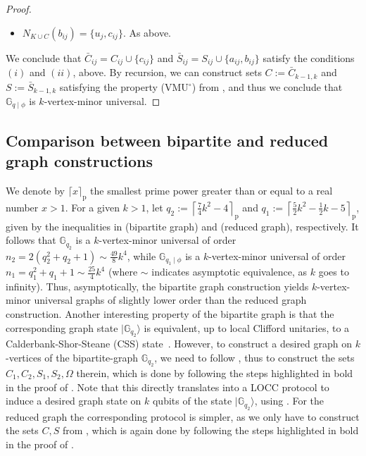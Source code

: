 \documentclass[a4paper,UKenglish,cleveref, autoref, thm-restate]{arxiv}
\newcommand{\ket}[1]{{\ensuremath{\lvert#1\rangle}}}
\newcommand{\G}[1][q]{\mathbb{G}_{#1}}
\newcommand{\Gphi}[1][q]{\mathbb{G}_{#1\mid\phi}}
\begin{document}
\begin{proof}
\begin{itemize}
        \item $N_{K \cup C}(b_{ij}) = \{u_{j}, c_{ij}\}$. As above.
    \end{itemize}
    
    We conclude that $\bar{C}_{ij} = C_{ij} \cup\{c_{ij}\}$ and $\bar{S}_{ij} = S_{ij} \cup\{a_{ij}, b_{ij}\}$ satisfy the conditions $(i)$ and $(ii)$, above. By recursion, we can construct sets $C := \bar{C}_{k-1,k}$ and $S := \bar{S}_{k-1,k}$ satisfying the property (VMU$^\circ$) from , and thus we conclude that $\Gphi$ is  $k$-vertex-minor universal.
\end{proof}

\subsection{Comparison between bipartite  and  reduced graph constructions}
\label{subsec:comparison-bipartite-reduced}

We denote by $\lceil x \rceil_\text{p}$ the smallest prime power greater than or equal to a real number $x > 1$. For a given $k > 1$, let $q_{2} := \left\lceil \frac{7}{4} k^2 - 4\right\rceil_\text{p}$ and $q_{1} := \left\lceil \frac{5}{2} k^2 - \frac{1}{2} k - 5\right\rceil_\text{p}$, given by the inequalities in  (bipartite graph) and  (reduced graph), respectively. It follows that $\G[q_2]$ is a $k$-vertex-minor universal of order $n_2 = 2(q_2^2+q_2+1) \sim \frac{49}{8}k^4$, while $\Gphi[q_1]$ is a $k$-vertex-minor universal of order $n_1 = q_1^2+q_1+1 \sim \frac{25}{4}k^4$  (where $\sim$ indicates asymptotic equivalence, as $k$ goes to infinity). Thus, asymptotically, the bipartite graph construction yields $k$-vertex-minor universal graphs of slightly lower order than the reduced graph construction. Another interesting property of the  bipartite graph  is that the corresponding graph state $\ket{\G[q_2]}$ is equivalent, up to local Clifford unitaries, to a Calderbank-Shor-Steane (CSS) state~\cite[Section~IV]{chen2004multi}. However,  to construct a desired graph on $k$-vertices of the bipartite-graph $\G[q_2]$, we need to follow , thus to construct the sets $C_1, C_2, S_1, S_2, \Omega$ therein, which is done by following the steps highlighted in bold in the proof of . Note that this directly translates into a LOCC protocol to induce a desired graph state on $k$ qubits of the state $\ket{\G[q_2]}$, using  . For the reduced graph  the corresponding protocol is simpler, as we only have to construct the sets $C, S$ from , which is again  done by following the steps highlighted in bold in the proof of .
\end{document}
